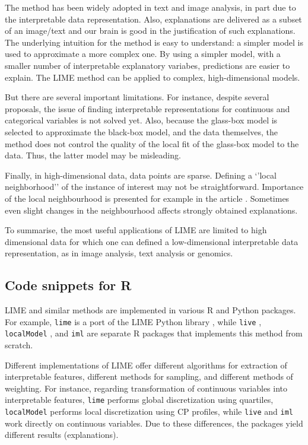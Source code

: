 \documentclass[12pt,]{krantz}
\begin{document}
The method has been widely adopted in text and image analysis, in part due to the interpretable data representation. Also, explanations are delivered as a subset of an image/text and our brain is good in the justification of such explanations. The underlying intuition for the method is easy to understand: a simpler model is used to approximate a more complex one. By using a simpler model, with a smaller number of interpretable explanatory variabes, predictions are easier to explain. The LIME method can be applied to complex, high-dimensional models.

But there are several important limitations. For instance, despite several proposals, the issue of finding interpretable representations for continuous and categorical variables is not solved yet. Also, because the glass-box model is selected to approximate the black-box model, and the data themselves, the method does not control the quality of the local fit of the glass-box model to the data. Thus, the latter model may be misleading.

Finally, in high-dimensional data, data points are sparse. Defining a `'local neighborhood'' of the instance of interest may not be straightforward.
Importance of the local neighbourhood is presented for example in the article \citep{LIMESHAPstability}. Sometimes even slight changes in the neighbourhood affects strongly obtained explanations.

To summarise, the most useful applications of LIME are limited to high dimensional data for which one can defined a low-dimensional interpretable data representation, as in image analysis, text analysis or genomics.

\hypertarget{LIMERcode}{%
\subsection{Code snippets for R}\label{LIMERcode}}

LIME and similar methods are implemented in various R and Python packages. For example, \texttt{lime} \citep{R-lime} is a port of the LIME Python library \citep{shapPackage}, while \texttt{live} \citep{R-live}, \texttt{localModel} \citep{localModelPackage}, and \texttt{iml} \citep{imlRPackage} are separate R packages that implements this method from scratch.

Different implementations of LIME offer different algorithms for extraction of interpretable features, different methods for sampling, and different methods of weighting. For instance, regarding transformation of continuous variables into interpretable features, \texttt{lime} performs global discretization using quartiles, \texttt{localModel} performs local discretization using CP profiles, while \texttt{live} and \texttt{iml} work directly on continuous variables.
Due to these differences, the packages yield different results (explanations).
\end{document}
